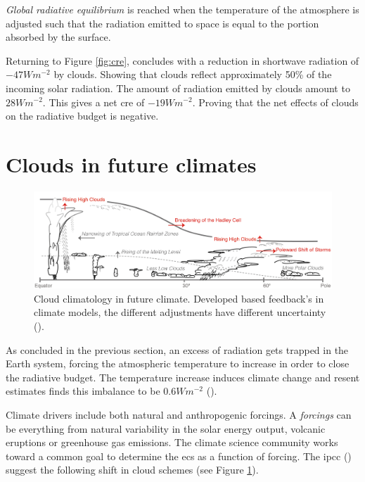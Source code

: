 \textit{Global radiative equilibrium} is reached when the temperature of the atmosphere is adjusted such that the radiation emitted to space is equal to the portion absorbed by the surface.

Returning to Figure \ref{fig:cre}, \citeauthor{Wild2019TheModels} concludes with a reduction in shortwave radiation of $-47Wm^{-2}$ by clouds. Showing that clouds reflect approximately 50\% of the incoming solar radiation. The amount of radiation emitted by clouds amount to $28Wm^{-2}$. This gives a net \acrshort{cre} of $-19Wm^{-2}$. Proving that the net effects of clouds on the radiative budget is negative. 

\section{Clouds in future climates} \label{sec:intro_cloud_future_climates}
\begin{figure}[h]
    \centering
    \includegraphics[scale = 0.8]{Chapter1_Intro/images/Fig7-11_ipcc.jpg}
    \caption{Cloud climatology in future climate. Developed based feedback's in climate models, the different adjustments have different uncertainty (\cite{IPCC_CH7_clouds}).}
    \label{fig:cloud_scheme}
\end{figure}
As concluded in the previous section, an excess of radiation gets trapped in the Earth system, forcing the atmospheric temperature to increase in order to close the radiative budget. The temperature increase induces climate change and resent estimates finds this imbalance to be $0.6 Wm^{-2}$ (\cite{Wild2019TheModels}).

Climate drivers include both natural and anthropogenic forcings. A \textit{forcings} can be everything from natural variability in the solar energy output, volcanic eruptions or greenhouse gas emissions. The climate science community works toward a common goal to determine the \acrshort{ecs} as a function of forcing. %
The \acrshort{ipcc} (\cite{IPCC_CH7_clouds}) suggest the following shift in cloud schemes (see Figure \ref{fig:cloud_scheme}). 

